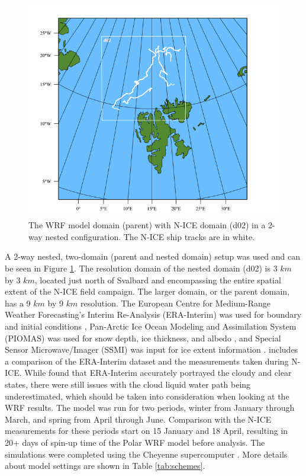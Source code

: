 \begin{figure}[H]
    \centering
    \includegraphics[width=1\linewidth]{figures/chapter3/wrf_domain.png}
    \caption[WRF Model Domain]{The WRF model domain (parent) with N-ICE domain (d02) in a 2-way nested configuration. The N-ICE ship tracks are in white.}
    \label{fig:wrf_domain}
\end{figure}

A 2-way nested, two-domain (parent and nested domain) setup was used and can be seen in Figure \ref{fig:wrf_domain}. The resolution domain of the nested domain (d02) is 3 $km$ by 3 $km$, located just north of Svalbard and encompassing the entire spatial extent of the N-ICE field campaign. The larger domain, or the parent domain, has a 9 $km$ by 9 $km$ resolution. The European Centre for Medium-Range Weather Forecasting’s Interim Re-Analysis (ERA-Interim) was used for boundary and initial conditions \citep{dee:2011}, Pan-Arctic Ice Ocean Modeling and Assimilation System (PIOMAS) was used for snow depth, ice thickness, and albedo \citep{PIOMASS}, and Special Sensor Microwave/Imager (SSMI) was input for ice extent information \cite{SSMI, schweiger:2011}. \citet{graham:2017} includes a comparison of the ERA-Interim dataset and the measurements taken during N-ICE. While \cite{graham:2017} found that ERA-Interim accurately portrayed the cloudy and clear states, there were still issues with the cloud liquid water path being underestimated, which should be taken into consideration when looking at the WRF results. The model was run for two periods, winter from January through March, and spring from April through June. Comparison with the N-ICE measurements for these periods start on 15 January and 18 April, resulting in 20+ days of spin-up time of the Polar WRF model before analysis. The simulations were completed using the Cheyenne supercomputer \citep{cheyenne}. More details about model settings are shown in Table \ref{tab:schemes}. 

